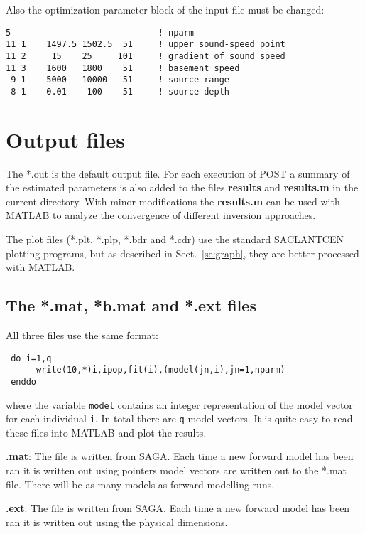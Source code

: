 \documentclass{saclantc}
\begin{document}
Also the optimization parameter block of the input file must be changed:
\small
\begin{verbatim}
5                             ! nparm
11 1    1497.5 1502.5  51     ! upper sound-speed point
11 2     15    25     101     ! gradient of sound speed
11 3    1600   1800    51     ! basement speed
 9 1    5000   10000   51     ! source range
 8 1    0.01    100    51     ! source depth 

\end{verbatim}
\normalsize

\section{Output files}
The *.out is the default output file.  For each execution of {\sf
POST} a summary of the estimated
parameters is also added to the files   {\bf results} and  {\bf results.m}
in the current directory. With minor modifications the {\bf results.m}
can be used with MATLAB to analyze the convergence of different
inversion approaches.

The plot files (*.plt, *.plp, *.bdr and *.cdr) use the standard SACLANTCEN
plotting programs, but as described in Sect.\ \ref{se:graph}, they are
better processed with MATLAB.

\subsection{The *.mat, *b.mat and *.ext files}

All three files  use the same format:
\small
\begin{verbatim}  
 do i=1,q
      write(10,*)i,ipop,fit(i),(model(jn,i),jn=1,nparm)
 enddo
\end{verbatim}
\normalsize
where the variable {\tt model} contains an integer representation of
the model vector for each individual {\tt i}.
In total there are {\tt q} model vectors.
It is quite easy to read these files into MATLAB and plot the results.

{\bf *.mat}: The file is written from  {\sf SAGA}. 
Each time a new forward model has been ran  it is 
written out using pointers
model vectors are  written out 
to the  *.mat file.    
There will be as many models as forward modelling runs.

{\bf *.ext}: The file is written from  {\sf SAGA}.  
Each time a new forward model has been ran  it is 
written out using the physical dimensions. 
\end{document}
